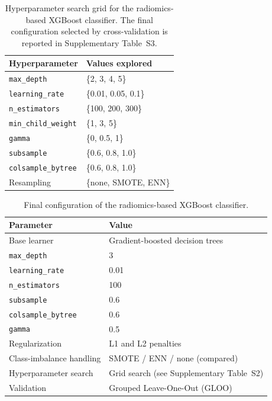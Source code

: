\documentclass[fleqn,10pt]{wlscirep}
\begin{document}
\begin{table}[H]
\centering
\begin{tabular}{ll}
\hline
Hyperparameter & Values explored \\
\hline
\texttt{max\_depth} & \{2, 3, 4, 5\} \\
\texttt{learning\_rate} & \{0.01, 0.05, 0.1\} \\
\texttt{n\_estimators} & \{100, 200, 300\} \\
\texttt{min\_child\_weight} & \{1, 3, 5\} \\
\texttt{gamma} & \{0, 0.5, 1\} \\
\texttt{subsample} & \{0.6, 0.8, 1.0\} \\
\texttt{colsample\_bytree} & \{0.6, 0.8, 1.0\} \\
Resampling & \{none, SMOTE, ENN\} \\
\hline
\end{tabular}
\caption{Hyperparameter search grid for the radiomics-based XGBoost classifier. The final configuration selected by cross-validation is reported in Supplementary Table~S3.}
\label{tab:xgb_grid}
\end{table}

\begin{table}[H]
\centering
\begin{tabular}{ll}
\hline
Parameter & Value \\
\hline
Base learner & Gradient-boosted decision trees \\
\texttt{max\_depth} & 3 \\
\texttt{learning\_rate} & 0.01 \\
\texttt{n\_estimators} & 100 \\
\texttt{subsample} & 0.6 \\
\texttt{colsample\_bytree} & 0.6 \\
\texttt{gamma} & 0.5 \\
Regularization & L1 and L2 penalties \\
Class-imbalance handling & SMOTE / ENN / none (compared) \\
Hyperparameter search & Grid search (see Supplementary Table~S2) \\
Validation & Grouped Leave-One-Out (GLOO) \\
\hline
\end{tabular}
\caption{Final configuration of the radiomics-based XGBoost classifier.}
\label{tab:ml_params}
\end{table}
\end{document}
